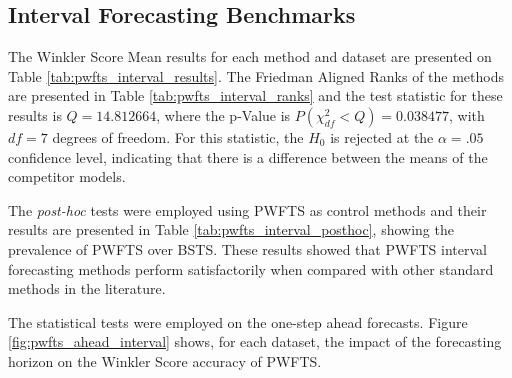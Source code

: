 \subsection{Interval Forecasting Benchmarks}
\label{sec:pwfts_experiments_interval}

The Winkler Score Mean results for each method and dataset are presented on Table \ref{tab:pwfts_interval_results}. The Friedman Aligned Ranks of the methods are presented in Table \ref{tab:pwfts_interval_ranks} and the test statistic for these results is $Q = 14.812664$, where the p-Value is $P(\chi^2_{df} < Q) = 0.038477$, with $df=7$ degrees of freedom. For this statistic, the $H_0$ is rejected at the $\alpha=.05$ confidence level, indicating that there is a difference between the means of the competitor models.

The \textit{post-hoc} tests were employed using PWFTS as control methods and their results are presented in Table \ref{tab:pwfts_interval_posthoc}, showing the prevalence of PWFTS over BSTS. These results showed that PWFTS interval forecasting methods perform satisfactorily when compared with other standard methods in the literature. 

The statistical tests were employed on the one-step ahead forecasts. Figure \ref{fig:pwfts_ahead_interval} shows, for each dataset, the impact of the forecasting horizon on the Winkler Score accuracy of PWFTS.


\begin{table}[h]
    \caption{Average Winkler Score with $\alpha=.05$ for one step ahead interval forecasts}
    \label{tab:pwfts_interval_results}
\end{table}

